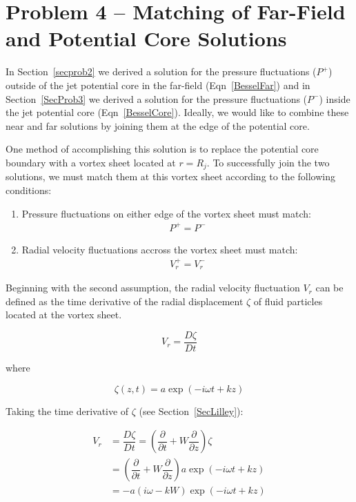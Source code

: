 \documentclass[]{aiaa-tc}%
\begin{document}
\section{Problem 4 -- Matching of Far-Field and Potential Core Solutions}

In Section~\ref{secprob2} we derived a solution for the pressure fluctuations ($P^+$) outside of the jet potential core in the far-field (Eqn~\ref{BesselFar}) and in Section~\ref{SecProb3} we derived a solution for the pressure fluctuations ($P^-$) inside the jet potential core (Eqn~\ref{BesselCore}).  Ideally, we would like to combine these near and far solutions by joining them at the edge of the potential core.

One method of accomplishing this solution is to replace the potential core boundary with a vortex sheet located at $r = R_j$.  To successfully join the two solutions, we must match them at this vortex sheet according to the following conditions:

\begin{enumerate}
  \item Pressure fluctuations on either edge of the vortex sheet must match:
        \begin{align}
          P^+ = P^-
        \end{align}
  \item Radial velocity fluctuations accross the vortex sheet must match:
        \begin{align}
          V_r^+ = V_r^-
        \end{align}
\end{enumerate}

Beginning with the second assumption, the radial velocity fluctuation $V_r$ can be defined as the time derivative of the radial displacement $\zeta$ of fluid particles located at the vortex sheet.

\begin{equation}
V_r = \dfrac{D\zeta}{Dt}
\end{equation}

\noindent where

\begin{equation}
\zeta(z,t) = a \exp(-i\omega t + kz)
\end{equation}

Taking the time derivative of $\zeta$ (see Section~\ref{SecLilley}):

\begin{align*}
V_r &= \dfrac{D\zeta}{Dt} =
    \left(\dfrac{\partial}{\partial t} + W \dfrac{\partial}{\partial z}\right)
    \zeta \\
    &=\left(\dfrac{\partial}{\partial t} + W \dfrac{\partial}{\partial z}\right)
    a \exp(-i\omega t + kz)\\
&= -a ( i\omega - kW ) \exp(-i\omega t + kz)
\end{align*}
\end{document}
